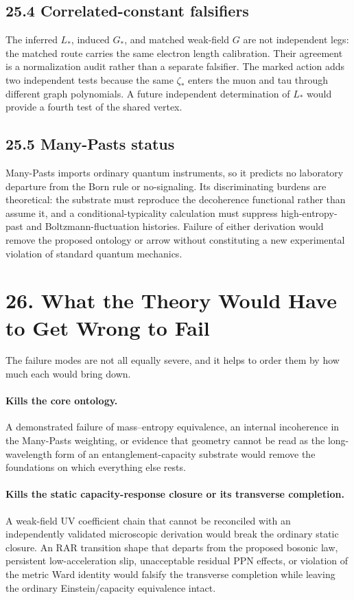 \documentclass[11pt]{article}
\begin{document}
\subsection{25.4 Correlated-constant falsifiers}

The inferred $L_*$, induced $G_*$, and matched weak-field $G$ are not independent legs: the matched route carries the same electron length calibration. Their agreement is a normalization audit rather than a separate falsifier. The marked action adds two independent tests because the same $\zeta_*$ enters the muon and tau through different graph polynomials. A future independent determination of $L_*$ would provide a fourth test of the shared vertex.

\subsection{25.5 Many-Pasts status}

Many-Pasts imports ordinary quantum instruments, so it predicts no laboratory departure from the Born rule or no-signaling. Its discriminating burdens are theoretical: the substrate must reproduce the decoherence functional rather than assume it, and a conditional-typicality calculation must suppress high-entropy-past and Boltzmann-fluctuation histories. Failure of either derivation would remove the proposed ontology or arrow without constituting a new experimental violation of standard quantum mechanics.
\section{26. What the Theory Would Have to Get Wrong to Fail}

The failure modes are not all equally severe, and it helps to order them by how much each would bring down.

\paragraph{Kills the core ontology.} A demonstrated failure of mass--entropy equivalence, an internal incoherence in the Many-Pasts weighting, or evidence that geometry cannot be read as the long-wavelength form of an entanglement-capacity substrate would remove the foundations on which everything else rests.

\paragraph{Kills the static capacity-response closure or its transverse completion.} A weak-field UV coefficient chain that cannot be reconciled with an independently validated microscopic derivation would break the ordinary static closure. An RAR transition shape that departs from the proposed bosonic law, persistent low-acceleration slip, unacceptable residual PPN effects, or violation of the metric Ward identity would falsify the transverse completion while leaving the ordinary Einstein/capacity equivalence intact.
\end{document}
